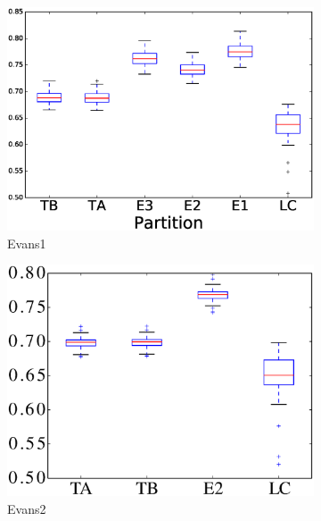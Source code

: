 \begin{figure}
	\begin{subfigure}{0.31\textwidth}
		\includegraphics[width=\linewidth]{img/ExpectedNodes/LF/LFR1_Evans1_ALL.eps}
		\caption{\label{fig:LFE1}Evans1}		
	\end{subfigure}
	\begin{subfigure}{0.31\textwidth}
		\includegraphics[width=\linewidth]{img/ExpectedNodes/LF/LFR1_Evans2_ALL.eps}
		\caption{\label{fig:LFE2}Evans2}		
	\end{subfigure}
	\begin{subfigure}{0.31\textwidth}

\end{subfigure}
\end{figure}

